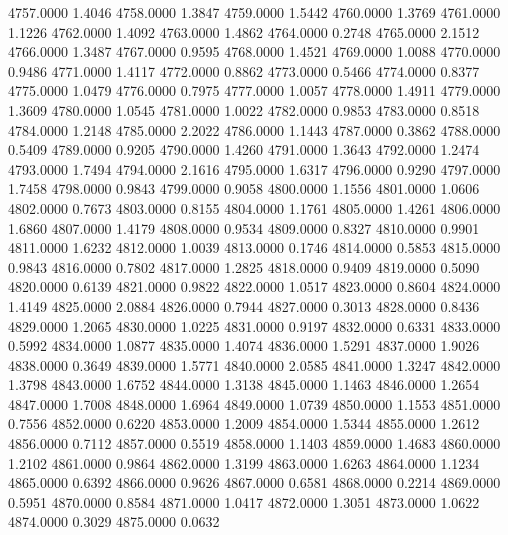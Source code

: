 4757.0000      1.4046
4758.0000      1.3847
4759.0000      1.5442
4760.0000      1.3769
4761.0000      1.1226
4762.0000      1.4092
4763.0000      1.4862
4764.0000      0.2748
4765.0000      2.1512
4766.0000      1.3487
4767.0000      0.9595
4768.0000      1.4521
4769.0000      1.0088
4770.0000      0.9486
4771.0000      1.4117
4772.0000      0.8862
4773.0000      0.5466
4774.0000      0.8377
4775.0000      1.0479
4776.0000      0.7975
4777.0000      1.0057
4778.0000      1.4911
4779.0000      1.3609
4780.0000      1.0545
4781.0000      1.0022
4782.0000      0.9853
4783.0000      0.8518
4784.0000      1.2148
4785.0000      2.2022
4786.0000      1.1443
4787.0000      0.3862
4788.0000      0.5409
4789.0000      0.9205
4790.0000      1.4260
4791.0000      1.3643
4792.0000      1.2474
4793.0000      1.7494
4794.0000      2.1616
4795.0000      1.6317
4796.0000      0.9290
4797.0000      1.7458
4798.0000      0.9843
4799.0000      0.9058
4800.0000      1.1556
4801.0000      1.0606
4802.0000      0.7673
4803.0000      0.8155
4804.0000      1.1761
4805.0000      1.4261
4806.0000      1.6860
4807.0000      1.4179
4808.0000      0.9534
4809.0000      0.8327
4810.0000      0.9901
4811.0000      1.6232
4812.0000      1.0039
4813.0000      0.1746
4814.0000      0.5853
4815.0000      0.9843
4816.0000      0.7802
4817.0000      1.2825
4818.0000      0.9409
4819.0000      0.5090
4820.0000      0.6139
4821.0000      0.9822
4822.0000      1.0517
4823.0000      0.8604
4824.0000      1.4149
4825.0000      2.0884
4826.0000      0.7944
4827.0000      0.3013
4828.0000      0.8436
4829.0000      1.2065
4830.0000      1.0225
4831.0000      0.9197
4832.0000      0.6331
4833.0000      0.5992
4834.0000      1.0877
4835.0000      1.4074
4836.0000      1.5291
4837.0000      1.9026
4838.0000      0.3649
4839.0000      1.5771
4840.0000      2.0585
4841.0000      1.3247
4842.0000      1.3798
4843.0000      1.6752
4844.0000      1.3138
4845.0000      1.1463
4846.0000      1.2654
4847.0000      1.7008
4848.0000      1.6964
4849.0000      1.0739
4850.0000      1.1553
4851.0000      0.7556
4852.0000      0.6220
4853.0000      1.2009
4854.0000      1.5344
4855.0000      1.2612
4856.0000      0.7112
4857.0000      0.5519
4858.0000      1.1403
4859.0000      1.4683
4860.0000      1.2102
4861.0000      0.9864
4862.0000      1.3199
4863.0000      1.6263
4864.0000      1.1234
4865.0000      0.6392
4866.0000      0.9626
4867.0000      0.6581
4868.0000      0.2214
4869.0000      0.5951
4870.0000      0.8584
4871.0000      1.0417
4872.0000      1.3051
4873.0000      1.0622
4874.0000      0.3029
4875.0000      0.0632
